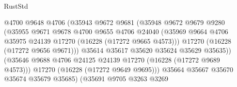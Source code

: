 \begin{lexlean}{RustStd}
\begin{coremodule}
                                        @4700
                                        @9648
                                        @4706
                                        (@35943
                                          @9672
                                          @9681
                                          (@35948
                                            @9672
                                            @9679
                                            @9280
                                            (@35955
                                              @9671
                                              @9678
                                              @4700
                                              @9655
                                              @4706
                                              @24040
                                              (@35969
                                                @9664
                                                @4706
                                                @35975
                                                @24139
                                                @17270
                                                (@16228 (@17272 @9665 @4573)))
                                              @17270
                                              (@16228 (@17272 @9656 @9671)))
                                            @35614
                                            @35617
                                            @35620
                                            @35624
                                            @35629
                                            @35635))
                                        (@35646
                                          @9688
                                          @4706
                                          @24125
                                          @24139
                                          @17270
                                          (@16228 (@17272 @9689 @4573)))
                                        @17270
                                        (@16228 (@17272 @9649 @9695)))
                                      @35664
                                      @35667
                                      @35670
                                      @35674
                                      @35679
                                      @35685)
                                    (@35691
                                      @9705
                                      @3263
                                      @3269

\end{coremodule}
\end{lexlean}
